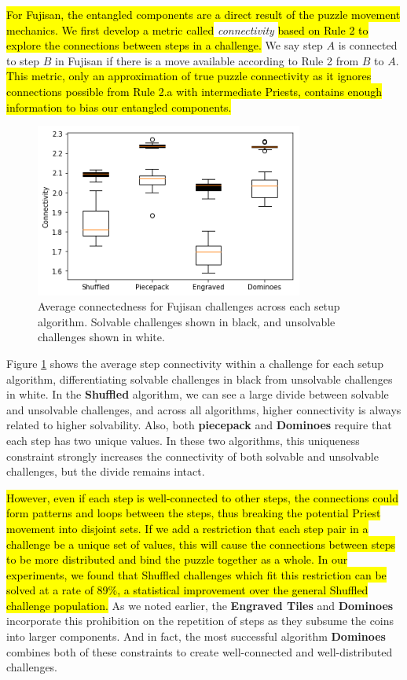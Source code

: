 \documentclass[journal]{IEEEtran}
\begin{document}
\hl{For Fujisan, the entangled components are a direct result of the puzzle movement mechanics. We first develop a metric called} {\it connectivity} \hl{based on Rule 2 to explore the connections between steps in a challenge.} We say step $A$ is connected to step $B$ in Fujisan if there is a move available according to Rule 2 from $B$ to $A$. \hl{This metric, only an approximation of true puzzle connectivity as it ignores connections possible from Rule 2.a with intermediate Priests, contains enough information to bias our entangled components.}

\begin{figure}[t]
\includegraphics[width=8.8cm]{connectivity.png}
\caption{Average connectedness for Fujisan challenges across each setup algorithm. 
Solvable challenges shown in black, and unsolvable challenges shown in white.}
\label{fig:connected}
\end{figure}



Figure \ref{fig:connected} shows the average step connectivity within a challenge for each setup algorithm, differentiating solvable challenges in black from unsolvable challenges in white. 
In the {\bf Shuffled} algorithm, we can see a large divide between solvable and unsolvable challenges, and across all algorithms, higher connectivity is always related to higher solvability. Also, both {\bf piecepack} and {\bf Dominoes} require that each step has two unique values. In these two algorithms, this uniqueness constraint strongly increases the connectivity of both solvable and unsolvable challenges, but the divide remains intact.

\hl{However, even if each step is well-connected to other steps, the connections could form patterns and loops between the steps, thus breaking the potential Priest movement into disjoint sets. If we add a restriction that each step pair in a challenge be a unique set of values, this will cause the connections between steps to be more distributed and bind the puzzle together as a whole. In our experiments, we found that Shuffled challenges which fit this restriction can be solved at a rate of 89\%, a statistical improvement over the general Shuffled challenge population.} As we noted earlier, the {\bf Engraved Tiles} and {\bf Dominoes} incorporate this prohibition on the repetition of steps as they subsume the coins into larger components. And in fact, the most successful algorithm {\bf Dominoes} combines both of these constraints to create well-connected and well-distributed challenges.
\end{document}
